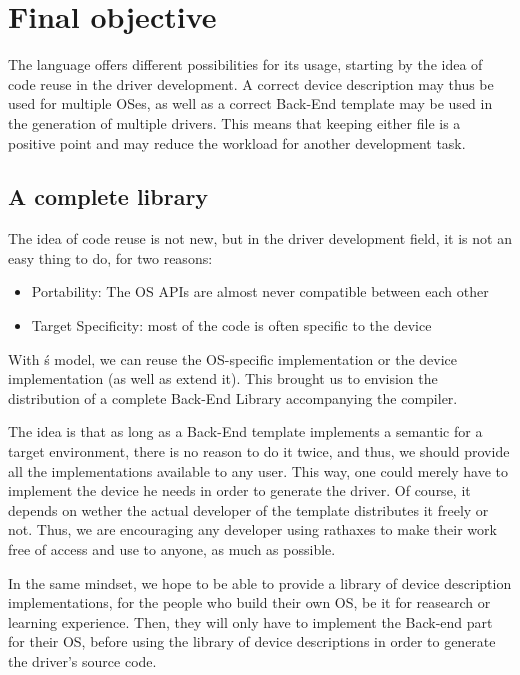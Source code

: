 \documentclass[american]{rtxreport}
\begin{document}
\section{Final objective}

The language offers different possibilities for its usage, starting by the idea
of code reuse in the driver development. A correct device description may thus
be used for multiple OSes, as well as a correct Back-End template may be used
in the generation of multiple drivers. This means that keeping either file is
a positive point and may reduce the workload for another development task.

\subsection{A complete library}

The idea of code reuse is not new, but in the driver development field,
it is not an easy thing to do, for two reasons:
\begin{itemize}
    \item Portability: The OS APIs are almost never compatible between
            each other
    \item Target Specificity: most of the code is often specific to the
            device
\end{itemize}

With \rtx\'s model, we can reuse the OS-specific implementation or the device
implementation (as well as extend it). This brought us to envision the
distribution of a complete Back-End Library accompanying the compiler.

The idea is that as long as a Back-End template implements a semantic for a
target environment, there is no reason to do it twice, and thus, we should
provide all the implementations available to any user. This way, one could
merely have to implement the device he needs in order to generate the driver.
Of course, it depends on wether the actual developer of the template
distributes it freely or not. Thus, we are encouraging any developer using
rathaxes to make their work free of access and use to anyone, as much as
possible.

In the same mindset, we hope to be able to provide a library of device
description implementations, for the people who build their own OS, be it
for reasearch or learning experience. Then, they will only have to implement
the Back-end part for their OS, before using the library of device
descriptions in order to generate the driver's source code.
\end{document}
